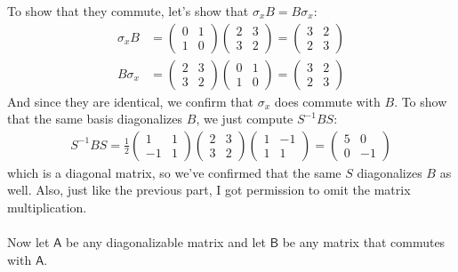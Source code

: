 \documentclass{article}
\begin{document}
\begin{solution}
	To show that they commute, let's show that $\sigma_x B = B \sigma_x$:
	\begin{align*}
		\sigma_x B &= \begin{pmatrix} 0 & 1\\1 & 0 \end{pmatrix} \begin{pmatrix} 2 & 3\\ 3& 2  \end{pmatrix} = \begin{pmatrix} 3 & 2\\ 2 & 3 \end{pmatrix} \\
		B \sigma_x &= \begin{pmatrix} 2 & 3\\ 3& 2 \end{pmatrix} \begin{pmatrix} 0 & 1\\1 & 0 \end{pmatrix} = \begin{pmatrix}  3& 2\\2 & 3 \end{pmatrix}
	\end{align*}
	And since they are identical, we confirm that $\sigma_x$ does commute with $B$. To show that the same basis
	diagonalizes $B$, we just compute $S^{-1} BS$:
	\begin{align*}
		S^{-1} BS = \frac{1}{2}\begin{pmatrix} 1 &1 \\ -1 & 1  \end{pmatrix} \begin{pmatrix} 2 & 3\\ 3 &2\end{pmatrix} \begin{pmatrix} 1 & -1 \\ 1 & 1 \end{pmatrix} = \begin{pmatrix} 5 & 0 \\ 0 & -1 \end{pmatrix} 
	\end{align*}
	which is a diagonal matrix, so we've confirmed that the same $S$ diagonalizes $B$ as well. Also, just like
	the previous part, I got permission to omit the matrix multiplication.
\end{solution}

\phline
\paragraph{}
Now let $\mathsf{A}$ be any diagonalizable matrix and let $\mathsf{B}$ be any matrix that commutes with $\mathsf{A}$.
\end{document}
